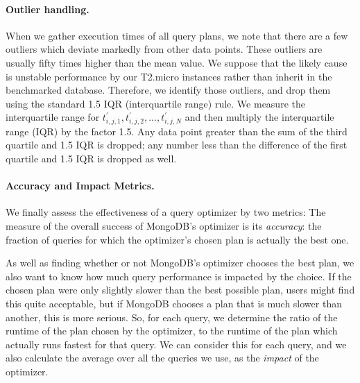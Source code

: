 \paragraph{\textbf{Outlier handling.}} When we gather execution times of all query plans, we note
that there are a few outliers which deviate markedly 
from other data points. These outliers are usually fifty 
times higher than the mean value. We suppose that the likely 
cause is unstable performance by our T2.micro instances
rather than inherit in the benchmarked database. 
Therefore, we identify those outliers, 
and drop them using the standard 1.5 IQR (interquartile range) rule. 
We measure the interquartile range for $t_{i,j,1}^{'}, 
t_{i,j,2}^{'}, ..., t_{i,j,N}^{'}$ and then multiply the
interquartile range (IQR) by the factor 1.5. Any data point
greater than the sum of the third quartile and 1.5 IQR is 
dropped; any number less than the difference of the first 
quartile and 1.5 IQR is dropped as well.

\paragraph{\textbf{Accuracy and Impact Metrics.}}
We finally assess the effectiveness of a query optimizer by two metrics: 
The measure of the overall success of MongoDB's optimizer is its \emph{accuracy}: the fraction of queries for which the optimizer's chosen plan is actually the best one.

As well as finding whether or not MongoDB's \approachName optimizer chooses the best plan, we also want to know how much query performance is impacted by the choice. If the chosen plan were only slightly slower than the best possible plan, users might find this quite acceptable, but if MongoDB chooses a plan that is much slower than another, this is more serious. So, for each query, we determine the ratio of the runtime of the plan chosen by the optimizer, to the runtime of the plan which actually runs fastest for that query. We can consider this for each query, and we also calculate the average over all the queries we use, as the \emph{impact} of the optimizer.


